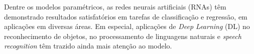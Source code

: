 Dentre os modelos paramétricos, as redes neurais artificiais (RNAs) têm demonstrado resultados satisfatórios em tarefas de classificação e regressão, em aplicações em diversas áreas. Em especial, aplicações de \emph{Deep Learning} (DL) no reconhecimento de objetos, no processamento de linguagens naturais e \emph{speech recognition} têm trazido ainda mais atenção ao modelo. 
